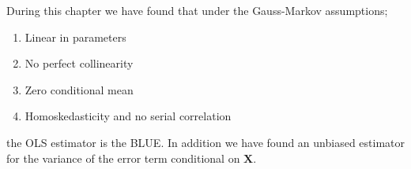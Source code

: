 During this chapter we have found that under the Gauss-Markov assumptions;
\begin{enumerate}
    \item Linear in parameters
    \item No perfect collinearity
    \item Zero conditional mean
    \item Homoskedasticity and no serial correlation
\end{enumerate}
 the OLS estimator is the BLUE. 
 In addition we have found an unbiased estimator for the variance of the error term conditional on $\textbf{X}$.